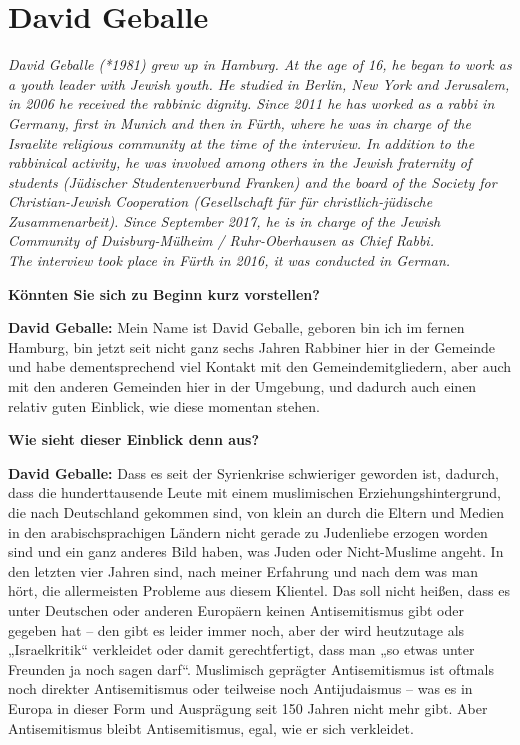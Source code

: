 \section{David Geballe} 

\textit{David Geballe (*1981) grew up in Hamburg. At the age of 16, he began to work as a youth leader with Jewish youth. He studied in Berlin, New York and Jerusalem, in 2006 he received the rabbinic dignity. Since 2011 he has worked as a rabbi in Germany, first in Munich and then in Fürth, where he was in charge of the Israelite religious community at the time of the interview. In addition to the rabbinical activity, he was involved among others in the Jewish fraternity of students (\textit{Jüdischer Studentenverbund Franken}) and the board of the Society for Christian-Jewish Cooperation (\textit{Gesellschaft für für christlich-jüdische Zusammenarbeit}). Since September 2017, he is in charge of the Jewish Community of Duisburg-Mülheim / Ruhr-Oberhausen as Chief Rabbi.\\
The interview took place in Fürth in 2016, it was conducted in German.}\par
\vspace*{2em}
\textbf{Könnten Sie sich zu Beginn kurz vorstellen?} 

\textbf{David Geballe:} Mein Name ist David Geballe, geboren bin ich im fernen Hamburg, bin jetzt seit nicht ganz sechs Jahren Rabbiner hier in der Gemeinde und habe dementsprechend viel Kontakt mit den Gemeindemitgliedern, aber auch mit den anderen Gemeinden hier in der Umgebung, und dadurch auch einen relativ guten Einblick, wie diese momentan stehen. 

\textbf{Wie sieht dieser Einblick denn aus?} 

\textbf{David Geballe:} Dass es seit der Syrienkrise schwieriger geworden ist, dadurch, dass die hunderttausende Leute mit einem muslimischen Erziehungshintergrund, die nach Deutschland gekommen sind, von klein an durch die Eltern und Medien in den arabischsprachigen Ländern nicht gerade zu Judenliebe erzogen worden sind und ein ganz anderes Bild haben, was Juden oder Nicht-Muslime angeht. In den letzten vier Jahren sind, nach meiner Erfahrung und nach dem was man hört, die allermeisten Probleme aus diesem Klientel. Das soll nicht heißen, dass es unter Deutschen oder anderen Europäern keinen Antisemitismus gibt oder gegeben hat – den gibt es leider immer noch, aber der wird heutzutage als „Israelkritik“ verkleidet oder damit gerechtfertigt, dass man „so etwas unter Freunden ja noch sagen darf“. Muslimisch geprägter Antisemitismus ist oftmals noch direkter Antisemitismus oder teilweise noch Antijudaismus – was es in Europa in dieser Form und Ausprägung seit 150 Jahren nicht mehr gibt. Aber Antisemitismus bleibt Antisemitismus, egal, wie er sich verkleidet. 

